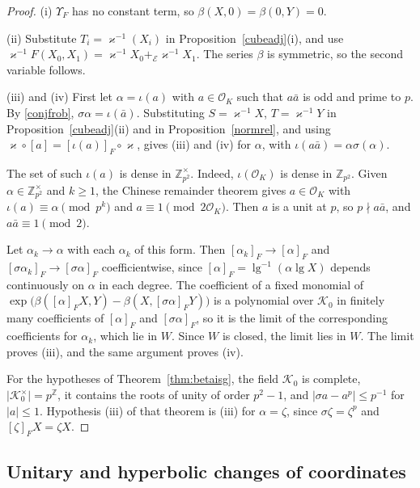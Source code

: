 \begin{proof}
(i) $\Upsilon_F$ has no constant term, so $\beta(X,0)=\beta(0,Y)=0$.

(ii) Substitute $T_i=\varkappa^{-1}(X_i)$ in Proposition~\ref{cubeadj}(i), and use $\varkappa^{-1}F(X_0,X_1)=\varkappa^{-1}X_0+_{\mathcal E}\varkappa^{-1}X_1$. The series $\beta$ is symmetric, so the second variable follows.

(iii) and (iv) First let $\alpha=\iota(a)$ with $a\in\mathcal O_K$ such that $a\bar a$ is odd and prime to $p$. By \eqref{conjfrob}, $\sigma\alpha=\iota(\bar a)$. Substituting $S=\varkappa^{-1}X$, $T=\varkappa^{-1}Y$ in Proposition~\ref{cubeadj}(ii) and in Proposition~\ref{normrel}, and using $\varkappa\circ[a]=[\iota(a)]_F\circ\varkappa$, gives (iii) and (iv) for $\alpha$, with $\iota(a\bar a)=\alpha\sigma(\alpha)$.

The set of such $\iota(a)$ is dense in $\mathbb Z_{p^2}^\times$. Indeed, $\iota(\mathcal O_K)$ is dense in $\mathbb Z_{p^2}$. Given $\alpha\in\mathbb Z_{p^2}^\times$ and $k\ge1$, the Chinese remainder theorem gives $a\in\mathcal O_K$ with $\iota(a)\equiv\alpha\pmod{p^k}$ and $a\equiv1\pmod{2\mathcal O_K}$. Then $a$ is a unit at $p$, so $p\nmid a\bar a$, and $a\bar a\equiv1\pmod 2$.

Let $\alpha_k\to\alpha$ with each $\alpha_k$ of this form. Then $[\alpha_k]_F\to[\alpha]_F$ and $[\sigma\alpha_k]_F\to[\sigma\alpha]_F$ coefficientwise, since $[\alpha]_F=\operatorname{lg}^{-1}(\alpha\operatorname{lg}X)$ depends continuously on $\alpha$ in each degree. The coefficient of a fixed monomial of $\exp\big(\beta([\alpha]_FX,Y)-\beta(X,[\sigma\alpha]_FY)\big)$ is a polynomial over $\mathcal K_0$ in finitely many coefficients of $[\alpha]_F$ and $[\sigma\alpha]_F$, so it is the limit of the corresponding coefficients for $\alpha_k$, which lie in $W$. Since $W$ is closed, the limit lies in $W$. The limit proves (iii), and the same argument proves (iv).

For the hypotheses of Theorem~\ref{thm:betaisg}, the field $\mathcal K_0$ is complete, $\lvert\mathcal K_0^\times\rvert=p^{\mathbb Z}$, it contains the roots of unity of order $p^2-1$, and $\lvert\sigma a-a^p\rvert\le p^{-1}$ for $\lvert a\rvert\le1$. Hypothesis (iii) of that theorem is (iii) for $\alpha=\zeta$, since $\sigma\zeta=\zeta^p$ and $[\zeta]_FX=\zeta X$.
\end{proof}

\subsection{Unitary and hyperbolic changes of coordinates}\label{sec:unitarychange}


